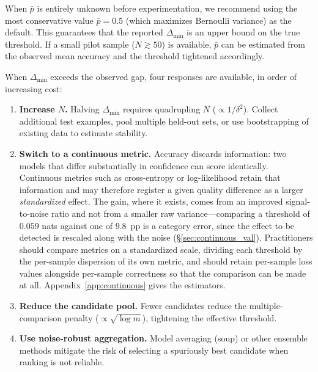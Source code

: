 \documentclass[pdflatex,sn-mathphys-ay,oneside]{sn-jnl}
\theoremstyle{thmstylethree}
\begin{document}
When $\bar{p}$ is entirely unknown before experimentation, we recommend using the most conservative value $\bar{p}=0.5$ (which maximizes Bernoulli variance) as the default. This guarantees that the reported $\Delta_{\min}$ is an upper bound on the true threshold. If a small pilot sample ($N\gtrsim50$) is available, $\bar{p}$ can be estimated from the observed mean accuracy and the threshold tightened accordingly.

When $\Delta_{\min}$ exceeds the observed gap, four responses are available, in order of increasing cost:
\begin{enumerate}
    \item \textbf{Increase $N$.} Halving $\Delta_{\min}$ requires quadrupling $N$ ($\propto 1/\delta^2$). Collect additional test examples, pool multiple held-out sets, or use bootstrapping of existing data to estimate stability.
    \item \textbf{Switch to a continuous metric.} Accuracy discards information: two models that differ substantially in confidence can score identically. Continuous metrics such as cross-entropy or log-likelihood retain that information and may therefore register a given quality difference as a larger \emph{standardized} effect. The gain, where it exists, comes from an improved signal-to-noise ratio and not from a smaller raw variance---comparing a threshold of $0.059$ nats against one of $9.8$~pp is a category error, since the effect to be detected is rescaled along with the noise (\S\ref{sec:continuous_val}). Practitioners should compare metrics on a standardized scale, dividing each threshold by the per-sample dispersion of its own metric, and should retain per-sample loss values alongside per-sample correctness so that the comparison can be made at all. Appendix~\ref{app:continuous} gives the estimators.
    \item \textbf{Reduce the candidate pool.} Fewer candidates reduce the multiple-comparison penalty ($\propto\sqrt{\log m}$), tightening the effective threshold.
    \item \textbf{Use noise-robust aggregation.} Model averaging (soup) or other ensemble methods mitigate the risk of selecting a spuriously best candidate when ranking is not reliable.
\end{enumerate}
\end{document}
